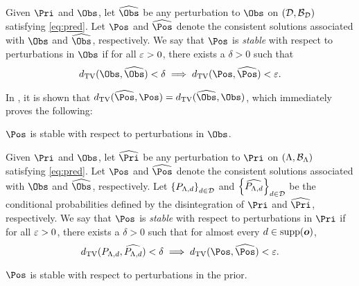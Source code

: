 \begin{frame}[t]

\begin{defn}\label{defn:stableobs}
Given $\Pri$ and $\Obs$, let $\widehat{\Obs}$ be any perturbation to $\Obs$ on $(\mathcal{D}, \mathcal{B}_{\mathcal{D}})$ satisfying \eqref{eq:pred}. 
Let $\Pos$ and $\widehat{\Pos}$ denote the consistent solutions associated with $\Obs$ and $\widehat{\Obs}$, respectively. 
We say that $\Pos$ is \emph{stable} with respect to perturbations in $\Obs$ if for all $\varepsilon > 0$, there exists a $\delta > 0$ such that
\begin{equation}
d_{\text{TV}} (\Obs, \widehat{\Obs}) < \delta \implies d_{\text{TV}} (\Pos, \widehat{\Pos}) < \eps.
\end{equation}
\end{defn}

In \cite{BJW18}, it is shown that $d_{\text{TV}} (\widehat{\Pos}, \Pos) = d_{\text{TV}} (\widehat{\Obs}, \Obs)$, which immediately proves the following:

\begin{theorem}
$\Pos$ is stable with respect to perturbations in $\Obs$.
\end{theorem}

\end{frame}

\begin{frame}[t]
\begin{defn}\label{defn:stableprior}
Given $\Pri$ and $\Obs$, let $\widehat{\Pri}$ be any perturbation to $\Pri$ on $({\Lambda}, \mathcal{B}_{{\Lambda}})$ satisfying \eqref{eq:pred}. 
Let $\Pos$ and $\widehat{\Pos}$ denote the consistent solutions associated with $\Obs$ and $\widehat{\Obs}$, respectively. 
Let $\left\{P_{{\Lambda}, d}\right\}_{d\in\mathcal{D}}^{}$ and $\left\{\widehat{P_{{\Lambda}, d}}\right\}_{d\in\mathcal{D}}^{}$ be the conditional probabilities defined by the disintegration of $\Pri$ and $\widehat{\Pri}$, respectively. 
We say that $\Pos$ is \emph{stable} with respect to perturbations in $\Pri$ if for all $\varepsilon > 0$, there exists a $\delta > 0$ such that for almost every $d\in\text{supp}(\operatorname*{\boldsymbol{o}})$, 
\begin{equation}\label{eq:stableprior}
d_{\text{TV}} (P_{\pspace, d}, \widehat{P_{\pspace, d}}) < \delta \implies d_{\text{TV}} (\Pos, \widehat{\Pos}) < \eps.
\end{equation}
\end{defn}

\begin{theorem}
$\Pos$ is stable with respect to perturbations in the prior.
\label{thm:stableprior}
\end{theorem}


\end{frame}

